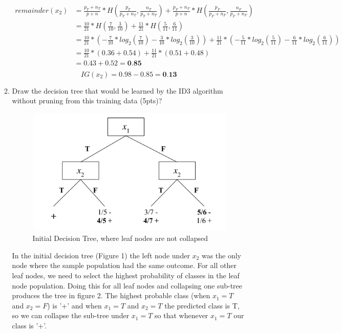 \documentclass[12pt]{article}
\begin{document}
\begin{enumerate}
\begin{enumerate}
\begin{equation*}
\begin{split}
	remainder(x_2) & = \frac{p_T + n_T}{p + n} * H(\frac{p_T}{p_T+n_T},\frac{n_T}{p_T+n_T}) + 
				      \frac{p_F+n_F}{p+n}*H(\frac{p_F}{p_F+n_F},\frac{n_F}{p_F+n_F})\\
	& = \frac{10}{21}*H(\frac{7}{10},\frac{3}{10}) + \frac{11}{21}*H(\frac{5}{11},\frac{6}{11})\\
	& = \frac{10}{21}*(-\frac{7}{10}*log_{2}(\frac{7}{10})-\frac{3}{10} * log_{2}(\frac{3}{10})) + 
	       \frac{11}{21}*(-\frac{5}{11}*log_{2}(\frac{5}{11})-\frac{6}{11}*log_{2}(\frac{6}{11}))\\
	& = \frac{10}{21}*(0.36+0.54) + \frac{11}{21}*(0.51+0.48)\\
	& = 0.43 + 0.52 = \textbf{0.85}\\
\end{split}
\end{equation*}
\begin{equation*}
	IG(x_{2}) = 0.98 - 0.85 = \textbf{0.13}
\end{equation*}
\hfill\newline
\newpage
\item Draw the decision tree that would be learned by the ID3 algorithm without pruning from this training data (5pts)?
\\
\begin{figure}[h]
\caption{Initial Decision Tree, where leaf nodes are not collapsed}
\includegraphics[width=10cm]{InitialTree}
\centering
\end{figure}

In the initial decision tree (Figure 1) the left node under $x_2$ was the only node where the sample population had the same outcome. For all other leaf nodes, we need to select the highest probability of classes in the leaf node population. Doing this for all leaf nodes and collapsing one sub-tree produces the tree in figure 2. The highest probable class (when $x_1 = T$ and $x_2 = F$) is '+' and when $x_1 = T$ and $x_2 = T$ the predicted class is T, so we can collapse the sub-tree under $x_1 = T$ so that whenever $x_1 = T$ our class is '+'.


\end{enumerate}
\end{enumerate}
\end{document}
